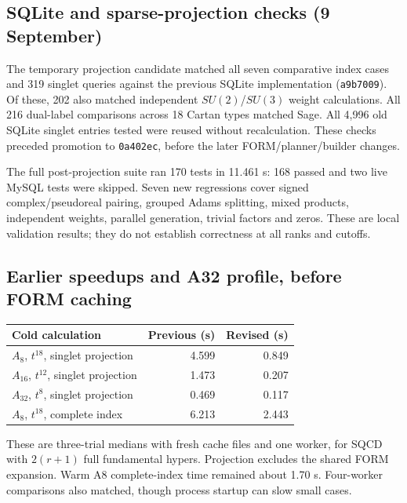 \documentclass[11pt,a4paper]{article}
\newcommand{\code}[1]{{\small\nolinkurl{#1}}}
\begin{document}
\subsection{SQLite and sparse-projection checks (9 September)}
The temporary projection candidate matched all seven comparative index cases and
319 singlet queries against the previous SQLite implementation (\code{a9b7009}).
Of these, 202 also matched independent $SU(2)$/$SU(3)$ weight calculations.
All 216 dual-label comparisons across 18 Cartan types matched Sage. All 4,996 old
SQLite singlet entries tested were reused without recalculation. These checks
preceded promotion to \code{0a402ec}, before the later FORM/planner/builder changes.

The full post-projection suite ran 170 tests in 11.461 s: 168 passed and two live
MySQL tests were skipped. Seven new regressions cover signed complex/pseudoreal
pairing, grouped Adams splitting, mixed products, independent weights, parallel
generation, trivial factors and zeros. These are local validation results;
they do not establish correctness at all ranks and cutoffs.

\clearpage
\subsection{Earlier speedups and A32 profile, before FORM caching}
\begin{tabularx}{\textwidth}{@{}Yrr@{}}
\toprule Cold calculation & Previous (s) & Revised (s)\\\midrule
$A_8$, $t^{18}$, singlet projection & 4.599 & 0.849\\
$A_{16}$, $t^{12}$, singlet projection & 1.473 & 0.207\\
$A_{32}$, $t^8$, singlet projection & 0.469 & 0.117\\
$A_8$, $t^{18}$, complete index & 6.213 & 2.443\\\bottomrule
\end{tabularx}
These are three-trial medians with fresh cache files and one worker, for SQCD
with $2(r+1)$ full fundamental hypers. Projection excludes the shared FORM
expansion. Warm A8 complete-index time remained about 1.70 s. Four-worker
comparisons also matched, though process startup can slow small cases.
\end{document}

